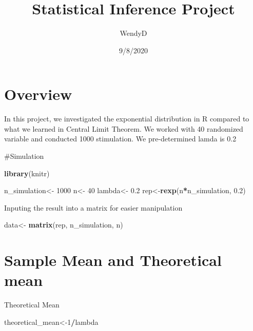\documentclass[
]{article}
\title{Statistical Inference Project}
\author{WendyD}
\date{9/8/2020}
\newenvironment{Shaded}{\begin{snugshade}}{\end{snugshade}}
\newcommand{\DecValTok}[1]{\textcolor[rgb]{0.00,0.00,0.81}{#1}}
\newcommand{\FloatTok}[1]{\textcolor[rgb]{0.00,0.00,0.81}{#1}}
\newcommand{\KeywordTok}[1]{\textcolor[rgb]{0.13,0.29,0.53}{\textbf{#1}}}
\newcommand{\NormalTok}[1]{#1}
\newcommand{\OperatorTok}[1]{\textcolor[rgb]{0.81,0.36,0.00}{\textbf{#1}}}
\newcommand{\StringTok}[1]{\textcolor[rgb]{0.31,0.60,0.02}{#1}}
\begin{document}
\maketitle

\hypertarget{overview}{%
\section{Overview}\label{overview}}

In this project, we investigated the exponential distribution in R
compared to what we learned in Central Limit Theorem. We worked with 40
randomized variable and conducted 1000 stimulation. We pre-determined
lamda is 0.2

\#Simulation

\begin{Shaded}
\begin{Highlighting}[]
\KeywordTok{library}\NormalTok{(knitr)}
\end{Highlighting}
\end{Shaded}

\begin{Shaded}
\begin{Highlighting}[]
\NormalTok{n_simulation<-}\StringTok{ }\DecValTok{1000}
\NormalTok{n<-}\StringTok{ }\DecValTok{40}
\NormalTok{lambda<-}\StringTok{ }\FloatTok{0.2}
\NormalTok{rep<-}\KeywordTok{rexp}\NormalTok{(n}\OperatorTok{*}\NormalTok{n_simulation, }\FloatTok{0.2}\NormalTok{)}
\end{Highlighting}
\end{Shaded}

Inputing the result into a matrix for easier manipulation

\begin{Shaded}
\begin{Highlighting}[]
\NormalTok{data<-}\StringTok{ }\KeywordTok{matrix}\NormalTok{(rep, n_simulation, n)}
\end{Highlighting}
\end{Shaded}

\hypertarget{sample-mean-and-theoretical-mean}{%
\section{Sample Mean and Theoretical
mean}\label{sample-mean-and-theoretical-mean}}

Theoretical Mean

\begin{Shaded}
\begin{Highlighting}[]
\NormalTok{theoretical_mean<-}\DecValTok{1}\OperatorTok{/}\NormalTok{lambda}
\end{Highlighting}
\end{Shaded}
\end{document}
